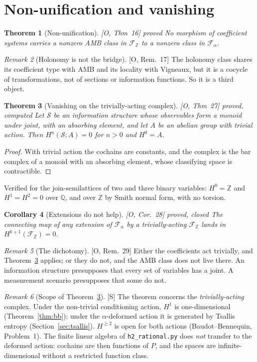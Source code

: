 \documentclass[11pt]{article}
\newtheorem{theorem}{Theorem}[section]
\newtheorem{corollary}[theorem]{Corollary}
\theoremstyle{definition}
\theoremstyle{remark}
\newtheorem{remark}[theorem]{Remark}
\newcommand{\Z}{\mathbb{Z}}
\newcommand{\Q}{\mathbb{Q}}
\newcommand{\src}[1]{\textsf{\small[#1]}}
\newcommand{\st}[1]{\textsf{\small\color{gray}#1}}
\begin{document}
\section{Non-unification and vanishing}
\begin{theorem}[Non-unification]\label{thm:nonunif}
\src{O, Thm~16} \st{proved}
No morphism of coefficient systems carries a nonzero AMB class in $\mathcal F_\Z$ to a nonzero class in $\mathcal F_\alpha$.
\end{theorem}
\begin{remark}[Holonomy is not the bridge]\src{O, Rem.~17} The holonomy class shares its coefficient type with AMB and its locality with Vigneaux, but it is a cocycle of transformations, not of sections or information functions. So it is a third object.\end{remark}
\begin{theorem}[Vanishing on the trivially-acting complex]\label{thm:vanish}
\src{O, Thm~27} \st{proved, computed}
Let $\mathcal S$ be an information structure whose observables form a monoid under joint, with an absorbing element, and let $A$ be an abelian group with trivial action. Then $H^n(\mathcal S;A)=0$ for $n>0$ and $H^0=A$.
\end{theorem}
\begin{proof}
With trivial action the cochains are constants, and the complex is the bar complex of a monoid with an absorbing element, whose classifying space is contractible.
\end{proof}
\noindent Verified for the join-semilattices of two and three binary variables: $H^0=\Z$ and $H^1=H^2=0$ over $\Q$, and over $\Z$ by Smith normal form, with no torsion.
\begin{corollary}[Extensions do not help]\src{O, Cor.~28} \st{proved, closed}
The connecting map of any extension of $\mathcal F_\alpha$ by a trivially-acting $\mathcal F_\Z$ lands in $H^{k+1}(\mathcal F_\Z)=0$.
\end{corollary}
\begin{remark}[The dichotomy]\src{O, Rem.~29}
Either the coefficients act trivially, and Theorem~\ref{thm:vanish} applies; or they do not, and the AMB class does not live there. An information structure presupposes that every set of variables has a joint. A measurement scenario presupposes that some do not.
\end{remark}
\begin{remark}[Scope of Theorem~\ref{thm:vanish}]\src{S}
The theorem concerns the \emph{trivially-acting} complex. Under the non-trivial conditioning action, $H^1$ is one-dimensional (Theorem~\ref{thm:bb}); under the $\alpha$-deformed action it is generated by Tsallis entropy (Section~\ref{sec:tsallis}). $H^{\ge2}$ is open for both actions (Baudot--Bennequin, Problem~1). The finite linear algebra of \texttt{h2\_rational.py} does \emph{not} transfer to the deformed action: cochains are then functions of $P$, and the spaces are infinite-dimensional without a restricted function class.
\end{remark}
\end{document}
